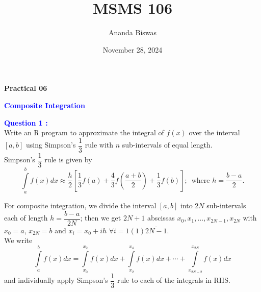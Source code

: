 \documentclass[11pt, a4paper]{article}\usepackage[]{graphicx}\usepackage[]{xcolor}
\title{MSMS 106}
\author{Ananda Biswas}
\date{November 28, 2024}
\begin{document}
\maketitle

\begin{center}
\textbf{Practical 06}
\end{center}

 \hspace{0.2cm} \textcolor{blue}{\textbf{Composite Integration}}

\vspace{0.5cm}

\smallpencil \hspace{0.2cm} \textcolor{blue}{\textbf{Question 1 : }} \\

\hspace{1cm} Write an R program to approximate the integral of $f(x)$ over the interval $[a, b]$ using Simpson's $\dfrac{1}{3}$ rule with $n$ sub-intervals of equal length. \\

\faArrowAltCircleRight[regular] \hspace{0.2cm} Simpson's $\dfrac{1}{3}$ rule is given by $$\int \limits_{a}^{b} f(x) dx \approx \dfrac{h}{2} \left[ \dfrac{1}{3} f(a) + \dfrac{4}{3} f\left(\dfrac{a+b}{2}\right) + \dfrac{1}{3} f(b) \right]; \,\,\, \text{where } h = \dfrac{b-a}{2}. $$

For composite integration, we divide the interval $[a, b]$ into $2N$ sub-intervals each of length $h = \dfrac{b-a}{2N}$; then we get $2N + 1$ abscissas $x_0, x_1, \ldots, x_{2N-1}, x_{2N}$ with $x_0 = a$, $x_{2N} = b$ and $x_i = x_0 + ih \,\, \forall i = 1(1)\overline{2N-1}$. \\

We write $$\int \limits_{a}^{b} f(x) dx = \int \limits_{x_0}^{x_2} f(x) dx + \int \limits_{x_2}^{x_4} f(x) dx + \cdots + \int \limits_{x_{2N-2}}^{x_{2N}} f(x) dx$$ and individually apply Simpson's $\dfrac{1}{3}$ rule to each of the integrals in RHS.
\end{document}
